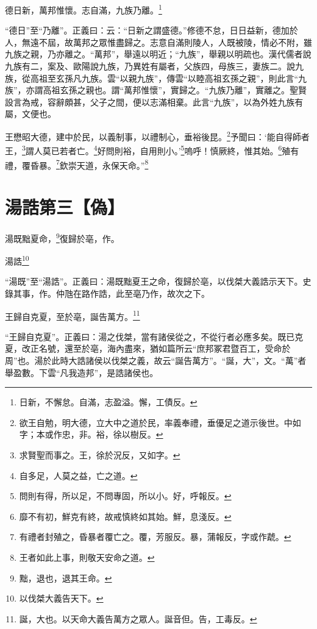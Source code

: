 德日新，萬邦惟懷。志自滿，九族乃離。\footnote{日新，不懈怠。自滿，志盈溢。懈，工債反。}

{\noindent\shu{}\fzkt “德日”至“乃離”。正義曰：云：“日新之謂盛德。”修德不怠，日日益新，德加於人，無遠不屆，故萬邦之眾惟盡歸之。志意自滿則陵人，人既被陵，情必不附，雖九族之親，乃亦離之。“萬邦”，舉遠以明近；“九族”，舉親以明疏也。漢代儒者說九族有二，案及、歐陽說九族，乃異姓有屬者，父族四，母族三，妻族二。說九族，從高祖至玄孫凡九族。雲“以親九族”，傳雲“以睦高祖玄孫之親”，則此言“九族”，亦謂高祖玄孫之親也。謂“萬邦惟懷”，實歸之。“九族乃離”，實離之。聖賢設言為戒，容辭頗甚，父子之間，便以志滿相棄。此言“九族”，以為外姓九族有屬，文便也。 \par}

王懋昭大德，建中於民，以義制事，以禮制心，垂裕後昆。\footnote{欲王自勉，明大德，立大中之道於民，率義奉禮，垂優足之道示後世。中如字；本或作忠，非。裕，徐以樹反。}予聞曰：‘能自得師者王，\footnote{求賢聖而事之。王，徐於況反，又如字。}謂人莫已若者亡。\footnote{自多足，人莫之益，亡之道。}好問則裕，自用則小。’\footnote{問則有得，所以足，不問專固，所以小。好，呼報反。}嗚呼！慎厥終，惟其始。\footnote{靡不有初，鮮克有終，故戒慎終如其始。鮮，息淺反。}殖有禮，覆昏暴。\footnote{有禮者封殖之，昏暴者覆亡之。覆，芳服反。暴，蒲報反，字或作虣。}欽崇天道，永保天命。”\footnote{王者如此上事，則敬天安命之道。}

\section{湯誥第三【偽】}

湯既黜夏命，\footnote{黜，退也，退其王命。}復歸於亳，作。

湯誥\footnote{以伐桀大義告天下。}

{\noindent\shu{}\fzkt “湯既”至“湯誥”。正義曰：湯既黜夏王之命，復歸於亳，以伐桀大義誥示天下。史錄其事，作。仲虺在路作誥，此至亳乃作，故次之下。 \par}

王歸自克夏，至於亳，誕告萬方。\footnote{誕，大也。以天命大義告萬方之眾人。誕音但。告，工毒反。}

{\noindent\shu{}\fzkt “王歸自克夏”。正義曰：湯之伐桀，當有諸侯從之，不從行者必應多矣。既已克夏，改正名號，還至於亳，海內盡來，猶如篇所云“庶邦冢君暨百工，受命於周”也。湯於此時大誥諸侯以伐桀之義，故云“誕告萬方”。“誕，大”，文。“萬”者舉盈數。下雲“凡我造邦”，是誥諸侯也。 \par}

